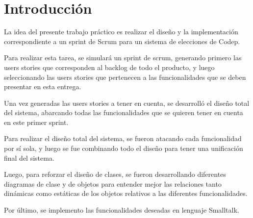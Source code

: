 \section{Introducci\'on}

La idea del presente trabajo pr\'actico es realizar el diseño y la implementaci\'on correspondiente a un sprint de Scrum para un sistema de elecciones de Codep.

Para realizar esta tarea, se simular\'a un sprint de scrum, generando primero las users stories que corresponden al backlog de todo el producto, y luego seleccionando las users stories que pertenecen a las funcionalidades que se deben presentar en esta entrega. 

Una vez generadas las users stories a tener en cuenta, se desarroll\'o el diseño total del sistema, abarcando todas las funcionalidades que se quieren tener en cuenta en este primer sprint.

Para realizar el diseño total del sistema, se fueron atacando cada funcionalidad por s\'i sola, y luego se fue combinando todo el diseño para tener una unificaci\'on final del sistema.

Luego, para reforzar el diseño de clases, se fueron desarrollando diferentes diagramas de clase y de objetos para entender mejor las relaciones tanto din\'amicas como est\'aticas de los objetos relativos a las diferentes funcionalidades.


Por \'ultimo, se implemento las funcionalidades deseadas en lenguaje Smalltalk.
